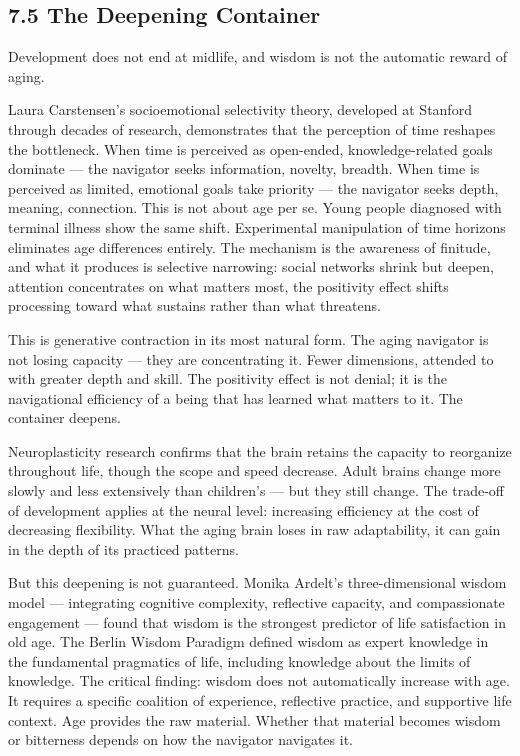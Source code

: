\subsection*{7.5 The Deepening Container}


Development does not end at midlife, and wisdom is not the automatic reward of aging.


Laura Carstensen's socioemotional selectivity theory, developed at Stanford through decades of research, demonstrates that the perception of time reshapes the bottleneck. When time is perceived as open-ended, knowledge-related goals dominate — the navigator seeks information, novelty, breadth. When time is perceived as limited, emotional goals take priority — the navigator seeks depth, meaning, connection. This is not about age per se. Young people diagnosed with terminal illness show the same shift. Experimental manipulation of time horizons eliminates age differences entirely. The mechanism is the awareness of finitude, and what it produces is selective narrowing: social networks shrink but deepen, attention concentrates on what matters most, the positivity effect shifts processing toward what sustains rather than what threatens.


This is generative contraction in its most natural form. The aging navigator is not losing capacity — they are concentrating it. Fewer dimensions, attended to with greater depth and skill. The positivity effect is not denial; it is the navigational efficiency of a being that has learned what matters to it. The container deepens.


Neuroplasticity research confirms that the brain retains the capacity to reorganize throughout life, though the scope and speed decrease. Adult brains change more slowly and less extensively than children's — but they still change. The trade-off of development applies at the neural level: increasing efficiency at the cost of decreasing flexibility. What the aging brain loses in raw adaptability, it can gain in the depth of its practiced patterns.


But this deepening is not guaranteed. Monika Ardelt's three-dimensional wisdom model — integrating cognitive complexity, reflective capacity, and compassionate engagement — found that wisdom is the strongest predictor of life satisfaction in old age. The Berlin Wisdom Paradigm defined wisdom as expert knowledge in the fundamental pragmatics of life, including knowledge about the limits of knowledge. The critical finding: wisdom does not automatically increase with age. It requires a specific coalition of experience, reflective practice, and supportive life context. Age provides the raw material. Whether that material becomes wisdom or bitterness depends on how the navigator navigates it.


